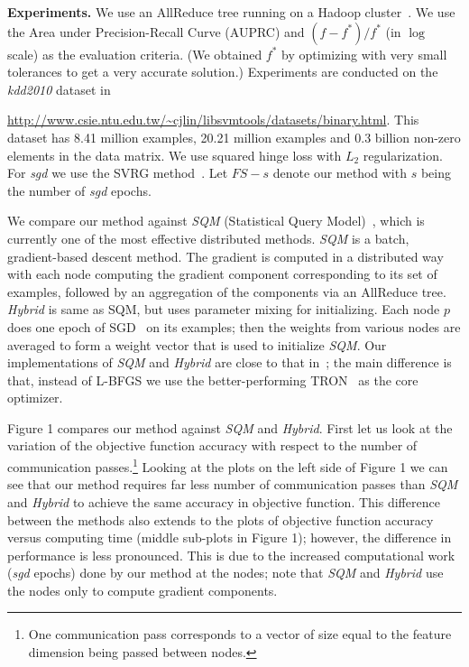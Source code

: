 \documentclass{article} %
\begin{document}
{\bf Experiments.} We use an AllReduce tree running on a Hadoop cluster~\cite{agarwal2011}. We use the Area under Precision-Recall Curve (AUPRC) and $(f-f^*)/f^*$ (in $\log$ scale) as the evaluation criteria. (We obtained $f^*$ by optimizing with very small tolerances to get a very accurate solution.) Experiments are conducted on the {\it kdd2010} dataset in {{\small{\url{http://www.csie.ntu.edu.tw/~cjlin/libsvmtools/datasets/binary.html}}}.
This dataset has 8.41 million examples, 20.21 million examples and 0.3 billion non-zero elements in the data matrix. We use squared hinge loss with $L_2$ regularization. For {\it sgd} we use the SVRG method~\cite{johnson2013}. Let $FS-s$ denote our method with $s$ being the number of {\it sgd} epochs.

We compare our method against {\it SQM} (Statistical Query Model)~\cite{chu2006,agarwal2011}, which is currently one of the most effective distributed methods. {\it SQM} is a batch, gradient-based descent method. The gradient is computed in a distributed way with each node computing the gradient component corresponding to its set of examples, followed by an aggregation of the components via an AllReduce tree. {\it Hybrid} is same as SQM, but uses parameter mixing for initializing. Each node $p$ does one epoch of SGD~\cite{bottou2010} on its examples; then the weights from various nodes are averaged to form a weight vector that is used to initialize {\it SQM}. Our implementations of {\it SQM} and {\it Hybrid} are close to that in~\cite{agarwal2011}; the main difference is that, instead of L-BFGS we use the better-performing TRON~\cite{lin2008} as the core optimizer.

Figure 1 compares our method against {\it SQM} and {\it Hybrid}. First let us look at the variation of the objective function accuracy with respect to the number of communication passes.\footnote{One communication pass corresponds to a vector of size equal to the feature dimension being passed between nodes.} Looking at the plots on the left side of Figure 1 we can see that our method requires far less number of communication passes than {\it SQM} and {\it Hybrid} to achieve the same accuracy in objective function. This difference between the methods also extends to the plots of objective function accuracy versus computing time (middle sub-plots in Figure 1); however, the difference in performance is less pronounced. This is due to the increased computational work ({\it sgd} epochs) done by our method at the nodes; note that {\it SQM} and {\it Hybrid} use the nodes only to compute gradient components.

}
\end{document}
